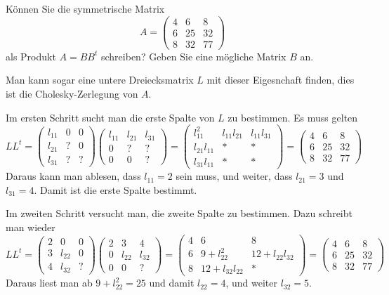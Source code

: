 Können Sie die symmetrische Matrix
\[
A=\begin{pmatrix}
 4& 6& 8\\
 6&25&32\\
 8&32&77
\end{pmatrix}
\]
als Produkt $A=BB^t$ schreiben? Geben Sie eine mögliche Matrix $B$ an.

\begin{loesung}
Man kann sogar eine untere Dreiecksmatrix $L$ mit dieser Eigesnchaft finden,
dies ist die Cholesky-Zerlegung von $A$.

Im ersten Schritt sucht man die erste Spalte von $L$ zu bestimmen.
Es muss gelten
\[
LL^t=
\begin{pmatrix}
l_{11}&  0&  0\\
l_{21}&  ?&  0\\
l_{31}&  ?&  ?
\end{pmatrix}
\begin{pmatrix}
l_{11}&l_{21}&l_{31}\\
     0&     ?&     ?\\
     0&     0&     ?
\end{pmatrix}
=
\begin{pmatrix}
    l_{11}^2&l_{11}l_{21}&l_{11}l_{31}\\
l_{21}l_{11}&           *&           *\\
l_{31}l_{11}&           *&           *
\end{pmatrix}
=
\begin{pmatrix}
 4& 6& 8\\
 6&25&32\\
 8&32&77
\end{pmatrix}
\]
Daraus kann man ablesen, dass $l_{11}=2$ sein muss, und weiter,
dass
$l_{21}=3$ und $l_{31}=4$. Damit ist die erste Spalte bestimmt.

Im zweiten Schritt versucht man, die zweite Spalte zu bestimmen.
Dazu schreibt man wieder
\[
LL^t
=
\begin{pmatrix}
2&     0&0\\
3&l_{22}&0\\
4&l_{32}&?
\end{pmatrix}
\begin{pmatrix}
2&     3&     4\\
0&l_{22}&l_{32}\\
0&     0&?
\end{pmatrix}
=
\begin{pmatrix}
 4&              6&             8\\
 6& 9+l_{22}^2    &12+l_{22}l_{32}\\
 8&12+l_{32}l_{22}&             *
\end{pmatrix}
=
\begin{pmatrix}
 4& 6& 8\\
 6&25&32\\
 8&32&77
\end{pmatrix}
\]
Daraus liest man ab $9+l_{22}^2=25$ und damit $l_{22}=4$, und weiter
$l_{32}=5$.


\end{loesung}
